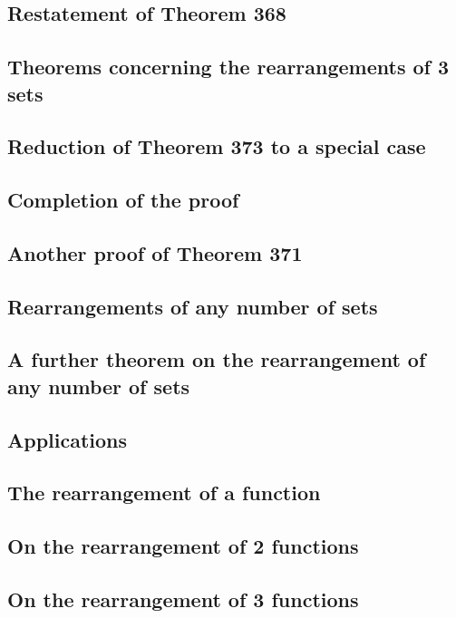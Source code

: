 \documentclass[oneside]{book}
\numberwithin{equation}{section}
\begin{document}
\subsection{Restatement of Theorem 368}

\subsection{Theorems concerning the rearrangements of 3 sets}

\subsection{Reduction of Theorem 373 to a special case}

\subsection{Completion of the proof}

\subsection{Another proof of Theorem 371}

\subsection{Rearrangements of any number of sets}

\subsection{A further theorem on the rearrangement of any number of sets}

\subsection{Applications}

\subsection{The rearrangement of a function}

\subsection{On the rearrangement of 2 functions}

\subsection{On the rearrangement of 3 functions}
\end{document}
